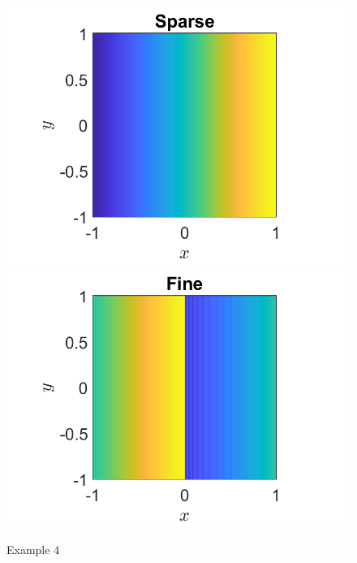 \documentclass[11pt, a4paper]{article}
\theoremstyle{definition}
\begin{document}
\begin{figure}[h]
	\centering
	\includegraphics[scale=0.3]{Ex4a.png}
	\includegraphics[scale=0.3]{Ex4b.png}
	\caption{Example 4} 
	\label{F4}
\end{figure} 	
\end{document}

